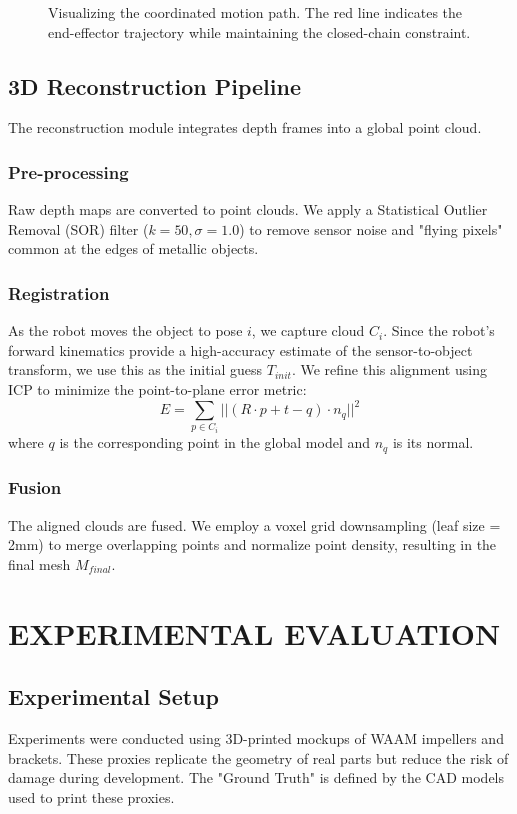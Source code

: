 \documentclass[letterpaper, 10 pt, conference]{ieeeconf}  %
\begin{document}
\begin{figure}[thpb]
   \centering
   \framebox{\parbox{3in}{}}
   \caption{Visualizing the coordinated motion path. The red line indicates the end-effector trajectory while maintaining the closed-chain constraint.}
   \label{fig:motion_plan}
\end{figure}

\subsection{3D Reconstruction Pipeline}
The reconstruction module integrates depth frames into a global point cloud.
\subsubsection{Pre-processing}
Raw depth maps are converted to point clouds. We apply a Statistical Outlier Removal (SOR) filter ($k=50, \sigma=1.0$) to remove sensor noise and "flying pixels" common at the edges of metallic objects.

\subsubsection{Registration}
As the robot moves the object to pose $i$, we capture cloud $C_i$. Since the robot's forward kinematics provide a high-accuracy estimate of the sensor-to-object transform, we use this as the initial guess $T_{init}$. We refine this alignment using ICP to minimize the point-to-plane error metric:
\begin{equation}
    E = \sum_{p \in C_i} || (R \cdot p + t - q) \cdot n_q ||^2
\end{equation}
where $q$ is the corresponding point in the global model and $n_q$ is its normal.

\subsubsection{Fusion}
The aligned clouds are fused. We employ a voxel grid downsampling (leaf size = 2mm) to merge overlapping points and normalize point density, resulting in the final mesh $M_{final}$.

\section{EXPERIMENTAL EVALUATION}

\subsection{Experimental Setup}
Experiments were conducted using 3D-printed mockups of WAAM impellers and brackets. These proxies replicate the geometry of real parts but reduce the risk of damage during development. The "Ground Truth" is defined by the CAD models used to print these proxies.
\end{document}

